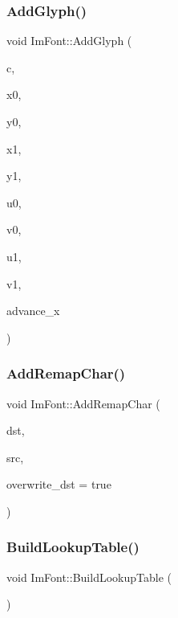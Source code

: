 \subsubsection{\texorpdfstring{Add\+Glyph()}{AddGlyph()}}
{\footnotesize\ttfamily void Im\+Font\+::\+Add\+Glyph (\begin{DoxyParamCaption}\item[{\mbox{\hyperlink{imgui_8h_af2c7badaf05a0008e15ef76d40875e97}{Im\+Wchar}}}]{c,  }\item[{float}]{x0,  }\item[{float}]{y0,  }\item[{float}]{x1,  }\item[{float}]{y1,  }\item[{float}]{u0,  }\item[{float}]{v0,  }\item[{float}]{u1,  }\item[{float}]{v1,  }\item[{float}]{advance\+\_\+x }\end{DoxyParamCaption})}

\mbox{\label{struct_im_font_aba8cd20f14ba47175d45d3f2063aa329}} 
\subsubsection{\texorpdfstring{Add\+Remap\+Char()}{AddRemapChar()}}
{\footnotesize\ttfamily void Im\+Font\+::\+Add\+Remap\+Char (\begin{DoxyParamCaption}\item[{\mbox{\hyperlink{imgui_8h_af2c7badaf05a0008e15ef76d40875e97}{Im\+Wchar}}}]{dst,  }\item[{\mbox{\hyperlink{imgui_8h_af2c7badaf05a0008e15ef76d40875e97}{Im\+Wchar}}}]{src,  }\item[{bool}]{overwrite\+\_\+dst = {\ttfamily true} }\end{DoxyParamCaption})}

\mbox{\label{struct_im_font_a04b3a1437bd0032722bbbd3613941162}} 
\subsubsection{\texorpdfstring{Build\+Lookup\+Table()}{BuildLookupTable()}}
{\footnotesize\ttfamily void Im\+Font\+::\+Build\+Lookup\+Table (\begin{DoxyParamCaption}{ }\end{DoxyParamCaption})}

